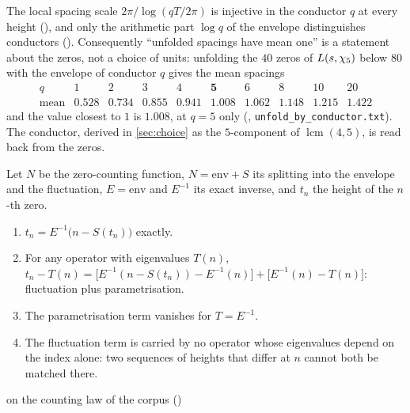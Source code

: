 \begin{proposition}\label{prop:envelope-exact}
The local spacing scale $2\pi/\log(qT/2\pi)$ is injective in the conductor $q$ at
every height (), and only the
arithmetic part $\log q$ of the envelope distinguishes conductors
().
Consequently ``unfolded spacings have mean one'' is a statement about the zeros,
not a choice of units: unfolding the $40$ zeros of $L(s,\chi_5)$ below $80$ with the
envelope of conductor $q$ gives the mean spacings
\[
\begin{array}{c|ccccccccc}
q&1&2&3&4&\mathbf5&6&8&10&20\\\hline
\text{mean}&0.528&0.734&0.855&0.941&\mathbf{1.008}&1.062&1.148&1.215&1.422
\end{array}
\]
and the value closest to $1$ is $1.008$, at $q=5$ only (,
\texttt{unfold\_by\_conductor.txt}).  The conductor, derived in %
\cref{sec:choice} as the $5$-component of $\operatorname{lcm}(4,5)$, is read back
from the zeros.
\end{proposition}

\begin{proposition}\label{prop:error-partition}
Let $N$ be the zero-counting function, $N=\mathrm{env}+S$ its splitting into the envelope
and the fluctuation, $E=\mathrm{env}$ and $E^{-1}$ its exact inverse, and $t_n$ the height of the
$n$-th zero.
\begin{enumerate}[label=\textup{(\roman*)}]
  \item $t_n=E^{-1}\bigl(n-S(t_n)\bigr)$ exactly.
  \item For any operator with eigenvalues $T(n)$,
    $t_n-T(n)=\bigl[E^{-1}(n-S(t_n))-E^{-1}(n)\bigr]+\bigl[E^{-1}(n)-T(n)\bigr]$:
    fluctuation plus parametrisation.
  \item The parametrisation term vanishes for $T=E^{-1}$.
  \item The fluctuation term is carried by no operator whose eigenvalues depend on the
    index alone: two sequences of heights that differ at $n$ cannot both be matched there.
\end{enumerate}


on the counting law of the corpus ()
\end{proposition}

